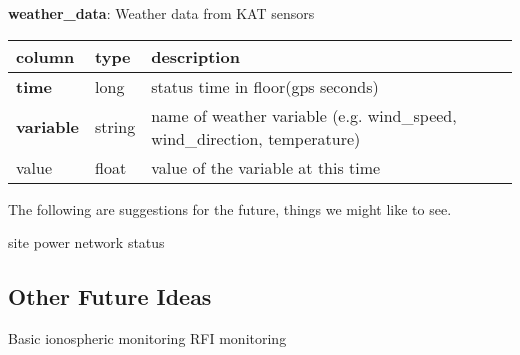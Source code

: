 \documentclass{article}
\begin{document}
\textbf{\large{weather\_data}}: Weather data from KAT sensors
\begin{center}
 \begin{tabular}{| p{4cm} | p{2cm} | p{10cm} |} 
\hline
 column & type & description \\ [0.5ex]  \hline\hline
\textbf{time} & long & status time in floor(gps seconds)\\ \hline
\textbf{variable} & string & name of weather variable (e.g. wind\_speed,  wind\_direction, temperature) \\ \hline
value & float & value of the variable at this time \\\hline
\end{tabular}
\end{center}

The following are suggestions for the future, things we might like to see.
\begin{outline}[enumerate]
	\1 site power
	\1 network status
\end{outline}

\subsection{Other Future Ideas}
\begin{outline}[enumerate]
	\1 Basic ionospheric monitoring
	\1 RFI monitoring
\end{outline}
\end{document}
